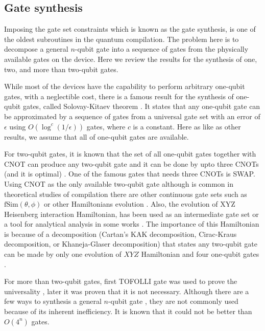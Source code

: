 \subsection{Gate synthesis}

Imposing the gate set constraints which is known as the gate synthesis, is one of the oldest subroutines in the quantum compilation. The problem here is to decompose a general $n$-qubit gate into a sequence of gates from the physically available gates on the device. Here we review the results for the synthesis of one, two, and more than two-qubit gates. 

While most of the devices have the capability to perform arbitrary one-qubit gates, with a neglectible cost, there is a famous result for the synthesis of one-qubit gates, called Solovay-Kitaev theorem \cite{dawson2006}. It states that any one-qubit gate can be approximated by a sequence of gates from a universal gate set with an error of $\epsilon$ using $O(\log^c(1/\epsilon))$ gates, where $c$ is a constant. Here as like as other results, we assume that all of one-qubit gates are available.

For two-qubit gates, it is known that the set of all one-qubit gates together with CNOT can produce any two-qubit gate and it can be done by upto three CNOTs (and it is optimal) \cite{vatan2004,vidal2004}. One of the famous gates that needs three CNOTs is SWAP. Using CNOT as the only available two-qubit gate although is common in theoretical studies of compilation \cite{zulehner2018,siraichi2018,li2019,zhang2021,zhou2020,itoko2019,murali2019} there are other continuous gate sets such as $\mathrm{fSim}(\theta, \phi)$ \cite{foxen2020} or other Hamiltonians evolution \cite{childsa}. Also, the evolution of XYZ Heisenberg interaction Hamiltonian, has been used as an intermediate gate set or a tool for analytical analysis in some works \cite{sousa2006,vidal2004}. The importance of this Hamiltonian is because of a decomposition (Cartan's KAK decomposition, Cirac-Kraus decomposition, or Khaneja-Glaser decomposition) that states any two-qubit gate can be made by only one evolution of $XYZ$ Hamiltonian and four one-qubit gates \cite{kraus2001,khaneja2001}.

For more than two-qubit gates, first TOFOLLI gate was used to prove the universality \cite{barenco1995}, later it was proven that it is not necessary. Although there are a few ways to synthesis a general $n$-qubit gate  \cite{sousa2006,shende2006}, they are not commonly used because of its inherent inefficiency. It is known that it could not be better than $O(4^n)$ gates. \cite{shende2006}

